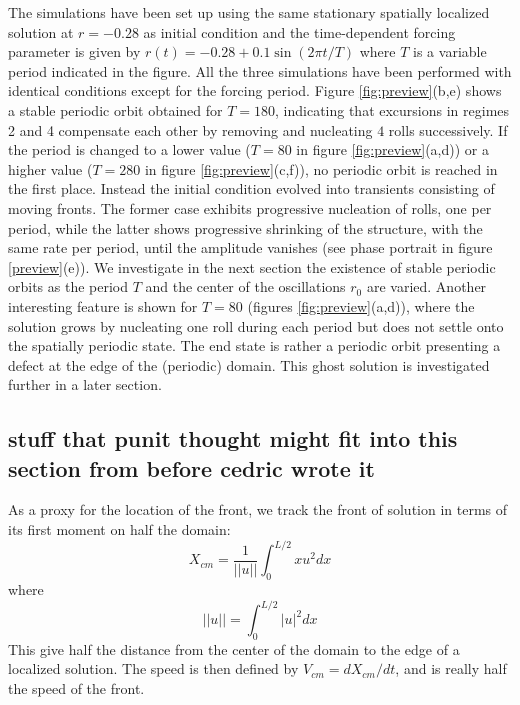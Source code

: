 \documentclass[../main/TimeForcingSHE.tex]{subfiles}
\begin{document}
The simulations have been set up using the same stationary spatially localized solution at $r=-0.28$ as initial condition and the time-dependent forcing parameter is given by $r(t) = -0.28 + 0.1 \sin (2 \pi t / T)$ where $T$ is a variable period indicated in the figure.
All the three simulations have been performed with identical conditions except for the forcing period.
Figure \ref{fig:preview}(b,e) shows a stable periodic orbit obtained for $T=180$, indicating that excursions in regimes 2 and 4 compensate each other by removing and nucleating $4$ rolls successively.
If the period is changed to a lower value ($T=80$ in figure \ref{fig:preview}(a,d)) or a higher value ($T=280$ in figure \ref{fig:preview}(c,f)), no periodic orbit is reached in the first place.
Instead the initial condition evolved into transients consisting of moving fronts.
The former case exhibits progressive nucleation of rolls, one per period, while the latter shows progressive shrinking of the structure, with the same rate per period, until the amplitude vanishes (see phase portrait in figure \ref{preview}(e)).
We investigate in the next section the existence of stable periodic orbits as the period $T$ and the center of the oscillations $r_0$ are varied.
Another interesting feature is shown for $T=80$ (figures \ref{fig:preview}(a,d)), where the solution grows by nucleating one roll during each period but does not settle onto the spatially periodic state.
The end state is rather a periodic orbit presenting a defect at the edge of the (periodic) domain.
This ghost solution is investigated further in a later section.






\subsection{stuff that punit thought might fit into this section from before cedric wrote it}

As a proxy for the location of the front, we track the front of solution in terms of its first moment on half the domain:
\begin{equation}
X_{cm}=\frac{1}{||u||} \int_{0}^{L/2}  x u^2 dx
\end{equation}
where 
\begin{equation}
||u||= \int_{0}^{L/2}  |u|^2 dx
\end{equation}
This give half the distance from the center of the domain to the edge of a localized solution. The speed is then defined by $V_{cm} = d X_{cm}/dt$, and is really half the speed of the front.
\end{document}
